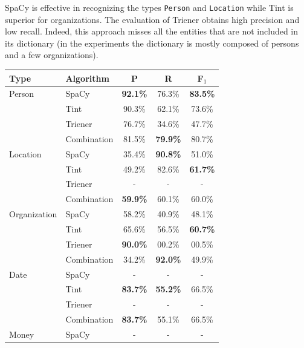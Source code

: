 SpaCy is effective in recognizing the types \texttt{Person} and \texttt{Location} while Tint is superior for organizations. The evaluation of Trie\ac{ner} obtains high precision and low recall. Indeed, this approach misses all the entities that are not included in its dictionary (in the experiments the dictionary is mostly composed of persons and a few organizations).

\begin{table}[H]
    \centering
    \begin{tabular}{l|l|ccc}
         Type         & Algorithm &   P   &   R   &   F$_1$ \\
        \midrule
        Person        & SpaCy   & \textbf{92.1\%} & 76.3\% & \textbf{83.5\%}\\
              & Tint    & 90.3\% & 62.1\% & 73.6\%\\
              & Trie\ac{ner}    & 76.7\% & 34.6\% & 47.7\%\\
              & Combination  & 81.5\% & \textbf{79.9\%} & 80.7\%\\
        \hline
        Location      & SpaCy   & 35.4\% & \textbf{90.8\%} & 51.0\%\\
                      & Tint    & 49.2\% & 82.6\% & \textbf{61.7\%}\\
                      & Trie\ac{ner}    & - & - & -\\
                      & Combination  & \textbf{59.9\%} & 60.1\% & 60.0\%\\
        \hline
        Organization  & SpaCy   & 58.2\% & 40.9\% & 48.1\%\\
                      & Tint    & 65.6\% & 56.5\% & \textbf{60.7\%}\\
                      & Trie\ac{ner}    & \textbf{90.0\%} & 00.2\% & 00.5\%\\ %
                      & Combination  & 34.2\% & \textbf{92.0\%} & 49.9\%\\
        \hline
        Date          & SpaCy   & - & - & -\\
                      & Tint    & \textbf{83.7\%} & \textbf{55.2\%} & 66.5\%\\
                      & Trie\ac{ner}    & - & - & -\\
                      & Combination  & \textbf{83.7\%} & 55.1\% & 66.5\%\\
        \hline
        Money         & SpaCy   & - & - & -\\

\end{tabular}
\end{table}
